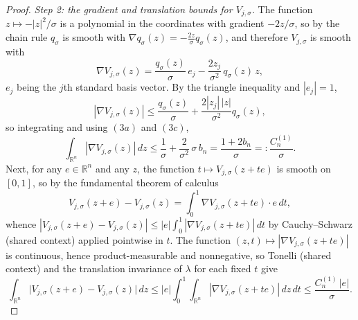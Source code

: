 \begin{proof}
\emph{Step 2: the gradient and translation bounds for $V_{j,\sigma}$.}
The function $z \mapsto -|z|^2/\sigma$ is a polynomial in the coordinates with
gradient $-2z/\sigma$, so by the chain rule $q_\sigma$ is smooth with
$\nabla q_\sigma(z) = -\frac{2z}{\sigma}q_\sigma(z)$, and therefore
$V_{j,\sigma}$ is smooth with
\[
  \nabla V_{j,\sigma}(z)
    = \frac{q_\sigma(z)}{\sigma}\,e_j - \frac{2z_j}{\sigma^2}\,q_\sigma(z)\,z ,
\]
$e_j$ being the $j$th standard basis vector.  By the triangle inequality and
$|e_j| = 1$,
\[
  |\nabla V_{j,\sigma}(z)|
    \leq \frac{q_\sigma(z)}{\sigma} + \frac{2|z_j|\,|z|}{\sigma^2}q_\sigma(z) ,
\]
so integrating and using $(3a)$ and $(3c)$,
\begin{equation*}
  \int_{\mathbb{R}^n}|\nabla V_{j,\sigma}(z)|\,dz
    \leq \frac1\sigma + \frac{2}{\sigma^2}\,\sigma\,b_n
    = \frac{1+2b_n}{\sigma}
    =: \frac{C^{(1)}_n}{\sigma} . \tag{6}
\end{equation*}
Next, for any $e \in \mathbb{R}^n$ and any $z$, the function
$t \mapsto V_{j,\sigma}(z+te)$ is smooth on $[0,1]$, so by the fundamental
theorem of calculus
\[
  V_{j,\sigma}(z+e) - V_{j,\sigma}(z)
    = \int_0^1 \nabla V_{j,\sigma}(z+te)\cdot e\,dt ,
\]
whence $|V_{j,\sigma}(z+e)-V_{j,\sigma}(z)| \leq |e|\int_0^1
|\nabla V_{j,\sigma}(z+te)|\,dt$ by Cauchy--Schwarz (shared context) applied
pointwise in $t$.  The function $(z,t) \mapsto |\nabla V_{j,\sigma}(z+te)|$ is
continuous, hence product-measurable and nonnegative, so Tonelli (shared
context) and the translation invariance of $\lambda$ for each fixed $t$ give
\begin{equation*}
  \int_{\mathbb{R}^n}\bigl|V_{j,\sigma}(z+e)-V_{j,\sigma}(z)\bigr|\,dz
    \leq |e|\int_0^1\!\!\int_{\mathbb{R}^n}|\nabla V_{j,\sigma}(z+te)|\,dz\,dt
    \leq \frac{C^{(1)}_n\,|e|}{\sigma} . \tag{7}
\end{equation*}


\end{proof}
